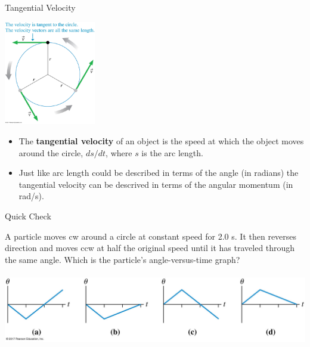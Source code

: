 \documentclass{beamer}
\newcommand{\red}[1]{{\color{red}{#1}}}
\newcommand{\checkl}[2]{\begin{textblock*}{1cm}(#1,#2){\large \red{\Checkmark}}\end{textblock*}}
\begin{document}
\begin{frame}{Tangential Velocity}
\begin{center}
   \includegraphics[width=0.3\textwidth]{../figures/04_21_Figure.jpg}
\end{center}
\begin{itemize}
   \item The {\bf tangential velocity} of an object is the speed at which the object moves around the circle, $ds/dt$, where $s$ is the arc length.
   \item<2-> Just like arc length could be described in terms of the angle (in radians) the tangential velocity can be descrived in terms of the angular momentum (in rad/s).
\end{itemize}
\end{frame}

\begin{frame}{Quick Check}
\begin{center}
   A particle moves cw around a circle at constant speed for 2.0 s. It then reverses direction and moves ccw at half the original speed until it has traveled through the same angle. Which is the particle's angle-versus-time graph? \\~\\
   \includegraphics[width=\textwidth]{../figures/Figure_STT4_5.jpg}
\end{center}
\only<2>{\checkl{5.0cm}{6.5cm}}
\end{frame}
\end{document}
